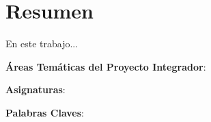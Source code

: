 \chapter*{Resumen}

En este trabajo...

\vspace{4.5cm}  %

\textbf{Áreas Temáticas del Proyecto Integrador}: 

\textbf{Asignaturas}: 

\textbf{Palabras Claves}:

\clearpage{\thispagestyle{empty}\cleardoublepage}       %